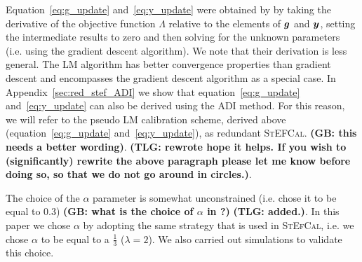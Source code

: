 \documentclass[useAMS,usenatbib]{mn2e}
\newcommand{\bg}{\bmath{g}}
\newcommand{\by}{\bmath{y}}
\begin{document}
Equation~\ref{eq:g_update} and~\ref{eq:y_update} were obtained by \citet{Marthi2014} by taking the derivative of the objective function $\Lambda$ relative to the elements of $\bg$ and $\by$, setting the intermediate results to zero and then solving for the unknown parameters (i.e. using the gradient descent algorithm). 
We note that their derivation is less general. The LM algorithm has better convergence properties than gradient descent and 
encompasses the gradient descent algorithm as a special case. In Appendix~\ref{sec:red_stef_ADI} we show that equation~\ref{eq:g_update} and~\ref{eq:y_update} can also be derived using the ADI method. 
For this reason, we will refer to the pseudo LM calibration scheme, derived above (equation~\ref{eq:g_update} and~\ref{eq:y_update}), as redundant \textsc{StEFCal}.
{\bf (GB: this needs a better wording)}.
{\bf (TLG: rewrote hope it helps. If you wish to (significantly) rewrite the above paragraph please let me know before doing so, so that we 
do not go around in circles.)}.

The choice of the $\alpha$ parameter is somewhat unconstrained (i.e. \citet{Marthi2014} chose it to be equal to $0.3$) {\bf (GB: what is the choice of $\alpha$ in \citet{Marthi2014}?)}
{\bf (TLG: added.)}. 
In this paper we chose $\alpha$ by adopting the same strategy that is used in \textsc{StEfCal},
i.e. we chose $\alpha$ to be equal to a $\frac{1}{3}$ ($\lambda = 2$). We also carried out simulations to validate this choice.
\end{document}
